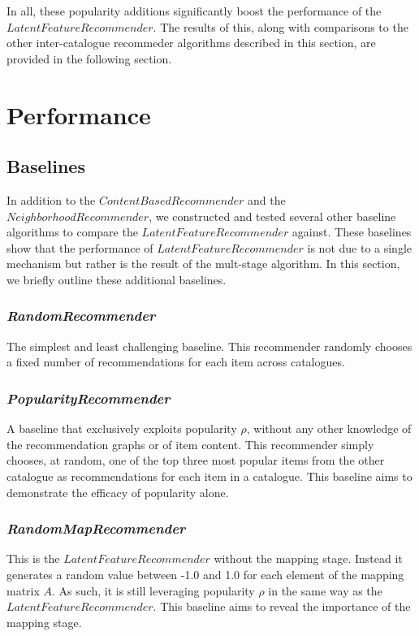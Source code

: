 \documentclass[11pt]{article}
\begin{document}
In all, these popularity additions significantly boost the performance of the
\linebreak $LatentFeatureRecommender$. The results of this, along with
comparisons to the other inter-catalogue  recommeder algorithms described in
this section, are provided in the following section.

\section*{Performance}
\subsection*{Baselines}
In addition to the $ContentBasedRecommender$ and the $NeighborhoodRecommender$,
we constructed and tested several other baseline algorithms to compare the
$LatentFeatureRecommender$ against. These baselines show that the performance of
$LatentFeatureRecommender$ is not due to a single mechanism but rather is the
result of the mult-stage algorithm. In this section, we briefly outline these
additional baselines.

\subsubsection*{\em RandomRecommender}
The simplest and least challenging baseline. This recommender randomly chooses a
fixed number of recommendations for each item across catalogues.

\subsubsection*{\em PopularityRecommender}
A baseline that exclusively exploits popularity $\rho$, without any other
knowledge of the recommendation graphs or of item content. This recommender
simply chooses, at random, one of the top three most popular items from the
other catalogue as recommendations for each item in a catalogue. This baseline
aims to demonstrate the efficacy of popularity alone.

\subsubsection*{\em RandomMapRecommender}
This is the $LatentFeatureRecommender$ without the mapping stage. Instead it
generates a random value between -1.0 and 1.0 for each element of the mapping
matrix $A$. As such, it is still leveraging popularity $\rho$ in the same way as
the $LatentFeatureRecommender$. This baseline aims to reveal the importance of
the mapping stage.
\end{document}
